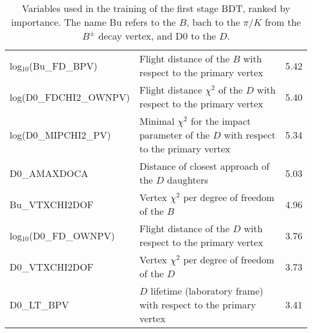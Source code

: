 \documentclass[oneside,12pt]{article}
\begin{document}
{\begin{landscape}
\begin{table}[]
{\begin{tabular}{lll}
log$_{10}$(Bu\_FD\_BPV)     & Flight  distance of the $B$ with respect to the 
primary vertex
                            & 5.42
                            \\
log(D0\_FDCHI2\_OWNPV)      & Flight distance $\chi^2$ of the $D$ with respect to
the primary vertex          & 5.40
                            \\
log(D0\_MIPCHI2\_PV)        & Minimal $\chi^2$ for the impact parameter of the $D$
with respect to the primary vertex
                            & 5.34
                            \\
D0\_AMAXDOCA                & Distance of closest approach of the $D$ daughters
                            & 5.03
                            \\
Bu\_VTXCHI2DOF              & Vertex $\chi^2$ per degree of freedom of the $B$
                            & 4.96
                            \\
log$_{10}$(D0\_FD\_OWNPV)   & Flight distance of the $D$ with respect to the
primary vertex              & 3.76
                            \\
D0\_VTXCHI2DOF              & Vertex $\chi^2$ per degree of freedom of the $D$
                            & 3.73
                            \\
D0\_LT\_BPV                 & $D$ lifetime (laboratory frame) with respect to 
the primary vertex          & 3.41
                            \\ \hline
\end{tabular}
} \caption{\small{Variables used in the training of the first stage BDT, ranked
by importance. The name Bu refers to the $B$, bach to the $\pi/K$ from the
$B^{\pm}$ decay vertex, and D0 to the $D$.}}
\label{table:bdt1TrainingVar}
\end{table}


\end{landscape}}
\end{document}

